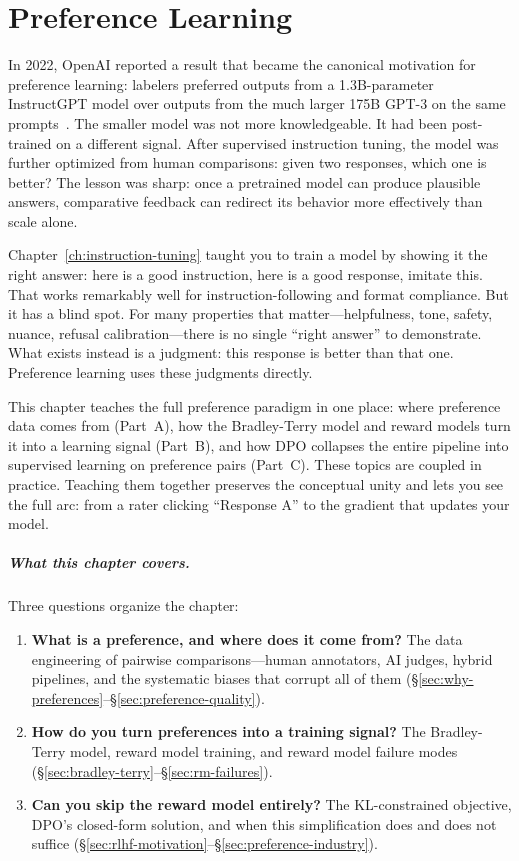 \chapter{Preference Learning}
\label{ch:preference-learning}
\raggedbottom

In 2022, OpenAI reported a result that became the canonical motivation for preference learning: labelers preferred outputs from a 1.3B-parameter InstructGPT model over outputs from the much larger 175B GPT-3 on the same prompts~\cite{ouyang2022instructgpt}. The smaller model was not more knowledgeable. It had been post-trained on a different signal. After supervised instruction tuning, the model was further optimized from human comparisons: given two responses, which one is better? The lesson was sharp: once a pretrained model can produce plausible answers, comparative feedback can redirect its behavior more effectively than scale alone.

Chapter~\ref{ch:instruction-tuning} taught you to train a model by showing it the right answer: here is a good instruction, here is a good response, imitate this. That works remarkably well for instruction-following and format compliance. But it has a blind spot. For many properties that matter---helpfulness, tone, safety, nuance, refusal calibration---there is no single ``right answer'' to demonstrate. What exists instead is a judgment: this response is better than that one. Preference learning uses these judgments directly.

This chapter teaches the full preference paradigm in one place: where preference data comes from (Part~A), how the Bradley-Terry model and reward models turn it into a learning signal (Part~B), and how DPO collapses the entire pipeline into supervised learning on preference pairs (Part~C). These topics are coupled in practice. Teaching them together preserves the conceptual unity and lets you see the full arc: from a rater clicking ``Response A'' to the gradient that updates your model.

\paragraph{What this chapter covers.} Three questions organize the chapter:

\begin{enumerate}[nosep]
  \item \textbf{What is a preference, and where does it come from?} The data engineering of pairwise comparisons---human annotators, AI judges, hybrid pipelines, and the systematic biases that corrupt all of them (\S\ref{sec:why-preferences}--\S\ref{sec:preference-quality}).
  \item \textbf{How do you turn preferences into a training signal?} The Bradley-Terry model, reward model training, and reward model failure modes (\S\ref{sec:bradley-terry}--\S\ref{sec:rm-failures}).
  \item \textbf{Can you skip the reward model entirely?} The KL-constrained objective, DPO's closed-form solution, and when this simplification does and does not suffice (\S\ref{sec:rlhf-motivation}--\S\ref{sec:preference-industry}).
\end{enumerate}

